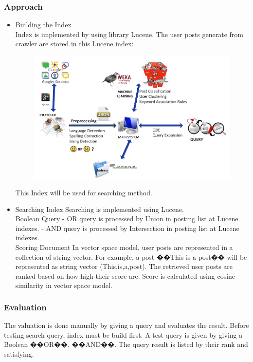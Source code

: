 \subsubsection*{Approach}
\begin{itemize}
\item Building the Index \\
Index is implemented by using library Lucene. The user posts generate from crawler are stored in this Lucene index: \\
\begin{figure}[h]
\begin{center}
\includegraphics[scale=0.4]{images/architecture.png}
\end{center}
\end{figure}
This Index will be used for searching method.
\item Searching Index
Searching is implemented using Lucene.
\\
Boolean Query
-          OR query is processed by Union in posting list at Lucene indexes.
-          AND query is processed by Intersection in posting list at Lucene indexes.
\\
Scoring Document
In vector space model, user posts are represented in a collection of string vector. For example, a post ��This is a post�� will be represented as string vector (This,is,a,post).
The retrieved user posts are ranked based on how high their score are. Score is calculated using cosine similarity in vector space model.
\end{itemize}

\subsubsection{Evaluation}
The valuation is done manually by giving a query and evaluates the result. Before testing search query, index must be build first. A test query is given by giving a Boolean ��OR��, ��AND��. The query result is listed by their rank and satisfying.


